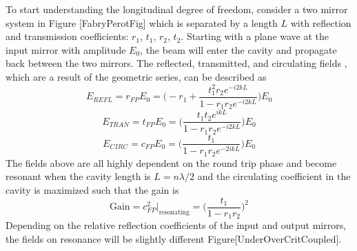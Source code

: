 		To start understanding the longitudinal degree of freedom, consider a two mirror system in Figure [FabryPerotFig] which is separated by a length $L$ with reflection and transmission coefficients: $r_1$, $t_1$, $r_2$, $t_2$.  Starting with a plane wave at the input mirror with amplitude $E_0$, the beam will enter the cavity and propagate back between the two mirrors.  The reflected, transmitted, and circulating fields \cite{Saulson}, which are a result of the geometric series, can be described as
		\begin{equation}\label{r_FP}
		E_{REFL} = r_{FP} E_0 = \bigg(-r_1 + \frac{t_1^2 r_2  e^{-i2kL}}{1-r_1 r_2 e^{-i2kL}} \bigg) E_0
		\end{equation}
		\begin{equation}\label{t_FP}
		E_{TRAN} = t_{FP} E_{0} = \bigg( \frac{t_1 t_2 e^{ikL}}{1-r_1 r_2 e^{-i2kL}}\bigg) E_0
		\end{equation}
		\begin{equation}\label{c_FP}
		E_{CIRC} = c_{FP} E_0 = \bigg(\frac{t_1}{1- r_1 r_2 e^{-2ikL}} \bigg) E_0
		\end{equation}
		The fields above are all highly dependent on the round trip phase and become resonant when the cavity length is $L = n \lambda / 2$ and the circulating coefficient in the cavity is maximized such that the gain is
		\begin{equation}
		\text{Gain} = c^2_{FP} \vert_{\text{resonating}} = \bigg( \frac{t_1}{1-r_1 r_2}\bigg)^2
		\end{equation}
		Depending on the relative reflection coefficients of the input and output mirrors, the fields on resonance will be slightly different Figure[UnderOverCritCoupled].
		

